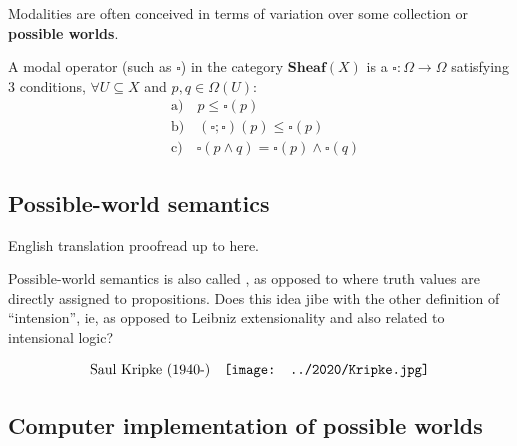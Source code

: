 Modalities are often conceived in terms of variation over some collection or \textbf{possible worlds}.

A modal operator (such as $\square$) in the category $\mathbf{Sheaf}(X)$ is a  $\square: \Omega \rightarrow \Omega$ satisfying 3 conditions, $\forall U \subseteq X$ and $p, q \in \Omega(U)$:
\begin{equation}
\begin{aligned}
& \mbox{a)} \quad p \le \square (p) \\
& \mbox{b)} \quad (\square ; \square) (p) \le \square (p) \\
& \mbox{c)} \quad \square (p \wedge q) = \square (p) \wedge \square (q)
\end{aligned}
\end{equation}

\subsection{Possible-world semantics}

{\color{red} English translation proofread up to here.}

Possible-world semantics is also called , as opposed to  where truth values are directly assigned to propositions.  Does this idea jibe with the other definition of ``intension'', ie, as opposed to Leibniz extensionality and also related to intensional logic?

\begin{equation}
\nonumber
\mbox{Saul Kripke (1940-)} \quad 
\vcenter{\hbox{\texttt{[image: ../2020/Kripke.jpg]}}}
\end{equation}

\subsection{Computer implementation of possible worlds}

\begin{itemize}
\end{itemize}

